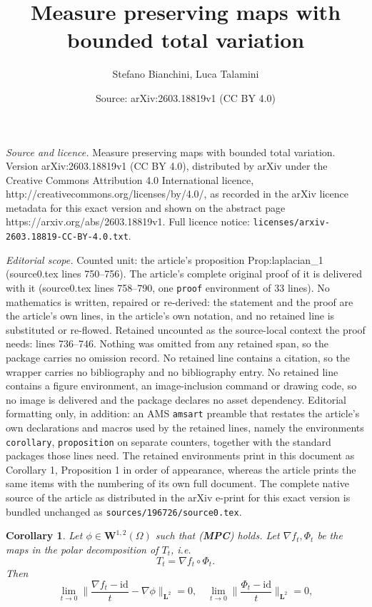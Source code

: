 \documentclass[10pt,a4paper]{amsart}
\title{Measure preserving maps with bounded total variation}
\author{Stefano Bianchini, Luca Talamini}
\date{Source: arXiv:2603.18819v1 (CC BY 4.0)}
\newtheorem{corollary}{Corollary}
\newcommand{\Id}{\mathrm{id}}
\begin{document}
\maketitle

\noindent\emph{Source and licence.} Measure preserving maps with bounded total variation. Version arXiv:2603.18819v1 (CC BY 4.0), distributed by arXiv under the Creative Commons Attribution 4.0 International licence, http://creativecommons.org/licenses/by/4.0/, as recorded in the arXiv licence metadata for this exact version and shown on the abstract page https://arxiv.org/abs/2603.18819v1. Full licence notice: \texttt{licenses/arxiv-2603.18819-CC-BY-4.0.txt}.\par\smallskip

\noindent\textit{Editorial scope.} Counted unit: the article's proposition Prop:laplacian\_1 (source0.tex lines 750--756). The article's complete original proof of it is delivered with it (source0.tex lines 758--790, one \texttt{proof} environment of 33 lines). No mathematics is written, repaired or re-derived: the statement and the proof are the article's own lines, in the article's own notation, and no retained line is substituted or re-flowed.  Retained uncounted as the source-local context the proof needs: lines 736--746.  Nothing was omitted from any retained span, so the package carries no omission record.  No retained line contains a citation, so the wrapper carries no bibliography and no bibliography entry.  No retained line contains a figure environment, an image-inclusion command or drawing code, so no image is delivered and the package declares no asset dependency.  Editorial formatting only, in addition: an AMS \texttt{amsart} preamble that restates the article's own declarations and macros used by the retained lines, namely the environments \texttt{corollary}, \texttt{proposition} on separate counters, together with the standard packages those lines need.  The retained environments print in this document as Corollary 1, Proposition 1 in order of appearance, whereas the article prints the same items with the numbering of its own full document.  The complete native source of the article as distributed in the arXiv e-print for this exact version is bundled unchanged as \texttt{sources/196726/source0.tex}.
\begin{corollary}
\label{Cor:conser_transprto}
Let $\phi \in \mathbf W^{1,2}(\Omega)$ such that \emph{(\textbf{MPC})} holds. Let $\nabla f_t, \Phi_t$ be the maps in the polar decomposition of $T_t$, i.e.
$$
T_t = \nabla f_t \circ \Phi_t.
$$
Then 
\begin{equation*}
\lim_{t \to 0} \bigg\| \frac{{\nabla f_t} - \Id}{t} - \nabla \phi \bigg\|_{\mathbf L^2} = 0, \quad \lim_{t \to 0} \bigg\| \frac{\Phi_t - \Id}{t} \bigg\|_{\mathbf L^2} = 0,
\end{equation*}
\end{corollary}
\end{document}
